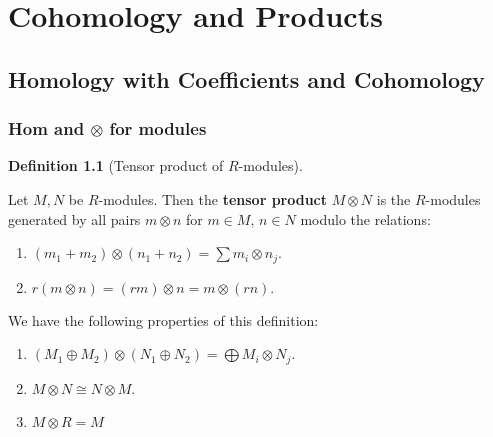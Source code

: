 \documentclass[10pt,]{book}
\newcommand{\terminology}[1]{\textbf{#1}}
\theoremstyle{plain}
\theoremstyle{definition}
\newtheorem{definition}[theorem]{Definition}
\numberwithin{equation}{section}
\begin{document}
\chapter[Cohomology and Products]{Cohomology and Products}\label{chapter-2}
\typeout{************************************************}
\typeout{************************************************}
\section[Homology with Coefficients and Cohomology]{Homology with Coefficients and Cohomology}\label{section-8}
\typeout{************************************************}
\typeout{************************************************}
\subsection[Hom and \(\otimes\) for modules]{Hom and \(\otimes\) for modules}\label{subsection-9}
\begin{definition}[Tensor product of \(R\)-modules]\label{definition-21}

              Let \(M,N\) be \(R\)-modules.
              Then the \terminology{tensor product }\(M\otimes N\) is the \(R\)-modules generated by all pairs \(m\otimes n\) for \(m\in M,\,n\in N\) modulo the relations:
              \begin{enumerate}
\item{}
                  \((m_1+m_2)\otimes (n_1 + n_2) = \sum m_i \otimes n_j.\)
                \item{}
                  \(r(m\otimes n) = (rm)\otimes n = m\otimes (rn).\)
                \end{enumerate}
\end{definition}

            We have the following properties of this definition:
            \begin{enumerate}
\item{}\((M_1\oplus M_2) \otimes (N_1\oplus N_2) = \bigoplus M_i\otimes N_j\).\item{}\(M\otimes N \cong N \otimes M\).\item{}\(M\otimes R = M\)\end{enumerate}
\end{document}
